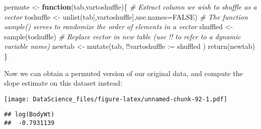 \documentclass[
]{book}
\newenvironment{Shaded}{\begin{snugshade}}{\end{snugshade}}
\newcommand{\AttributeTok}[1]{\textcolor[rgb]{0.77,0.63,0.00}{#1}}
\newcommand{\CommentTok}[1]{\textcolor[rgb]{0.56,0.35,0.01}{\textit{#1}}}
\newcommand{\ConstantTok}[1]{\textcolor[rgb]{0.00,0.00,0.00}{#1}}
\newcommand{\ControlFlowTok}[1]{\textcolor[rgb]{0.13,0.29,0.53}{\textbf{#1}}}
\newcommand{\DecValTok}[1]{\textcolor[rgb]{0.00,0.00,0.81}{#1}}
\newcommand{\FunctionTok}[1]{\textcolor[rgb]{0.00,0.00,0.00}{#1}}
\newcommand{\NormalTok}[1]{#1}
\newcommand{\OtherTok}[1]{\textcolor[rgb]{0.56,0.35,0.01}{#1}}
\newcommand{\SpecialCharTok}[1]{\textcolor[rgb]{0.00,0.00,0.00}{#1}}
\newcommand{\StringTok}[1]{\textcolor[rgb]{0.31,0.60,0.02}{#1}}
\begin{document}
\begin{Shaded}
\begin{Highlighting}[]
\NormalTok{permute }\OtherTok{\textless{}{-}} \ControlFlowTok{function}\NormalTok{(tab,vartoshuffle)\{}
  \CommentTok{\# Extract column we wish to shuffle as a vector}
\NormalTok{  toshuffle }\OtherTok{\textless{}{-}} \FunctionTok{unlist}\NormalTok{(tab[,vartoshuffle],}\AttributeTok{use.names=}\ConstantTok{FALSE}\NormalTok{)}
  \CommentTok{\# The function sample() serves to randomize the order of elements in a vector}
\NormalTok{  shuffled }\OtherTok{\textless{}{-}} \FunctionTok{sample}\NormalTok{(toshuffle)}
  \CommentTok{\# Replace vector in new table (use !! to refer to a dynamic variable name)}
\NormalTok{  newtab }\OtherTok{\textless{}{-}} \FunctionTok{mutate}\NormalTok{(tab, }\SpecialCharTok{!!}\AttributeTok{vartoshuffle :=}\NormalTok{ shuffled )}
  \FunctionTok{return}\NormalTok{(newtab)}
\NormalTok{\}}
\end{Highlighting}
\end{Shaded}

Now we can obtain a permuted version of our original data, and compute the slope estimate on this dataset instead:

\begin{Shaded}
\end{Shaded}

\texttt{[image: DataScience\_files/figure-latex/unnamed-chunk-92-1.pdf]}

\begin{Shaded}
\end{Shaded}

\begin{verbatim}
## log(BodyWt) 
##  -0.7931139
\end{verbatim}
\end{document}
